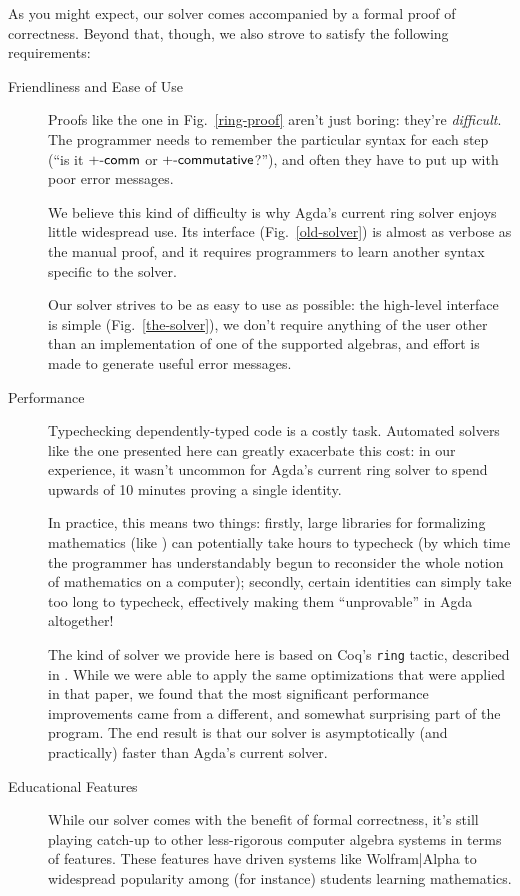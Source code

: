 \documentclass[acmsmall,review,anonymous]{acmart}\settopmatter{printfolios=true,printccs=false,printacmref=false}
\begin{document}
As you might expect, our solver comes accompanied by a formal proof of
correctness. Beyond that, though, we also strove to satisfy the following
requirements:
\begin{description}
  \item[Friendliness and Ease of Use] Proofs like the one in
    Fig.~\ref{ring-proof} aren't just boring: they're \emph{difficult}.
    The programmer needs to remember the particular syntax for each step (``is
    it \(\AgdaFunction{+-comm}\) or \(\AgdaFunction{+-commutative}\)?''), and
    often they have to put up with poor error messages.

    We believe this kind of difficulty is why Agda's current ring solver
    \cite{danielsson_agda_2018} enjoys little widespread use. Its interface
    (Fig.~\ref{old-solver}) is almost as verbose as the manual proof, and it
    requires programmers to learn another syntax specific to the solver.

    Our solver strives to be as easy to use as possible: the high-level
    interface is simple (Fig.~\ref{the-solver}), we don't require anything
    of the user other than an implementation of one of the supported algebras,
    and effort is made to generate useful error messages.
  \item[Performance] Typechecking dependently-typed code is a costly task.
    Automated solvers like the one presented here can greatly exacerbate this
    cost: in our experience, it wasn't uncommon for Agda's current ring solver
    to spend upwards of 10 minutes proving a single identity.

    In practice, this means two things: firstly, large libraries for formalizing
    mathematics (like \citet{meshveliani_docon-provable_2018}) can potentially
    take hours to typecheck (by which time the programmer has understandably
    begun to reconsider the whole notion of mathematics on a computer);
    secondly, certain identities can simply take too long to typecheck,
    effectively making them ``unprovable'' in Agda altogether!

    The kind of solver we provide here is based on Coq's
    \cite{the_coq_development_team_2018_1219885} \verb+ring+ tactic, described
    in \citet{gregoire_proving_2005}. While we were able to apply the same
    optimizations that were applied in that paper, we found that the most
    significant performance improvements came from a different, and somewhat
    surprising part of the program. The end result is that our solver is
    asymptotically (and practically) faster than Agda's current solver.
  \item[Educational Features] While our solver comes with the benefit of formal
    correctness, it's still playing catch-up to other less-rigorous computer
    algebra systems in terms of features. These features have driven systems
    like Wolfram|Alpha \cite{wolfram_research_inc._wolframalpha_2019} to
    widespread popularity among (for instance) students learning mathematics.


\end{description}
\end{document}
